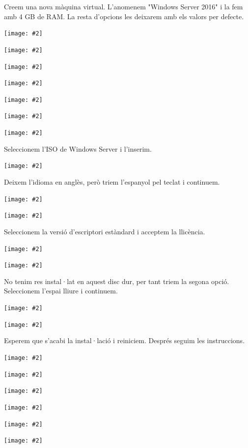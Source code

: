 \documentclass[a4paper,12pt]{article}
\newcommand{\mygraphic}[2][width=0.9\textwidth]{\begin{center}
		\centering\texttt{[image: \#2]}\par
\end{center}}
\begin{document}


Creem una nova màquina virtual. L'anomenem "Windows Server 2016" i la fem amb 4 GB de RAM. La resta d'opcions les deixarem amb els valors per defecte.
\mygraphic{imatges/1.png}
\mygraphic{imatges/2.png}
\mygraphic{imatges/3.png}
\mygraphic{imatges/4.png}
\mygraphic{imatges/5.png}
\mygraphic{imatges/6.png}
\mygraphic{imatges/7.png}
Seleccionem l'ISO de Windows Server i l'inserim.
\mygraphic[height=0.45\textheight]{imatges/8.png}
Deixem l'idioma en anglès, però triem l'espanyol pel teclat i continuem.
\mygraphic[height=0.45\textheight]{imatges/9.png}
\mygraphic[height=0.45\textheight]{imatges/10.png}
\newpage
Seleccionem la versió d'escriptori estàndard i acceptem la llicència.
\mygraphic[height=0.45\textheight]{imatges/11.png}
\mygraphic[height=0.45\textheight]{imatges/12.png}
\newpage
No tenim res instal·lat en aquest disc dur, per tant triem la segona opció. Seleccionem l'espai lliure i continuem.
\mygraphic[height=0.45\textheight]{imatges/13.png}
\mygraphic[height=0.45\textheight]{imatges/14.png}
\newpage
Esperem que s'acabi la instal·lació i reiniciem. Després seguim les instruccions.
\mygraphic[height=0.45\textheight]{imatges/15.png}
\mygraphic[height=0.45\textheight]{imatges/16.png}
\mygraphic{imatges/17.png}
\mygraphic{imatges/18.png}
\mygraphic{imatges/19.png}
\mygraphic{imatges/20.png}
\end{document}
